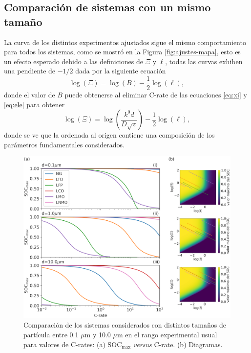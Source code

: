 \subsection{Comparación de sistemas con un mismo tamaño}

La curva de los distintos experimentos ajustados sigue el mismo comportamiento 
para todos los sistemas, como se mostró en la Figura \ref{fig:ajustes-mapa},
esto es un efecto esperado debido a las definiciones de $\Xi$ y $\ell$, todas las
curvas exhiben una pendiente de $-1/2$ dada por la siguiente ecuación
\begin{equation}
    \log(\Xi) = \log(B) - \frac{1}{2}\log(\ell),
\end{equation}
donde el valor de $B$ puede obtenerse al eliminar C-rate de las ecuaciones 
\ref{eq:xi} y \ref{eq:ele} para obtener
\begin{equation}
    \log(\Xi) = \log\left(\frac{k^0 d}{D \sqrt{z}}\right) - \frac{1}{2}\log(\ell),
\end{equation}
donde se ve que la ordenada al origen contiene una composición de los parámetros
fundamentales considerados. 

\begin{figure}[t]
    \centering
    \includegraphics[width=\textwidth]{FastCharging/un/resultados/comparacion/comparacion.png}
    \caption{Comparación de los sistemas considerados con distintos tamaños de 
    partícula entre 0.1 $\mu$m y 10.0 $\mu$m en el rango experimental usual para 
    valores de C-rates: (a) SOC$_{\max}$ \textit{versus} C-rate. (b) Diagramas.}
    \label{fig:comparacion}
\end{figure}

